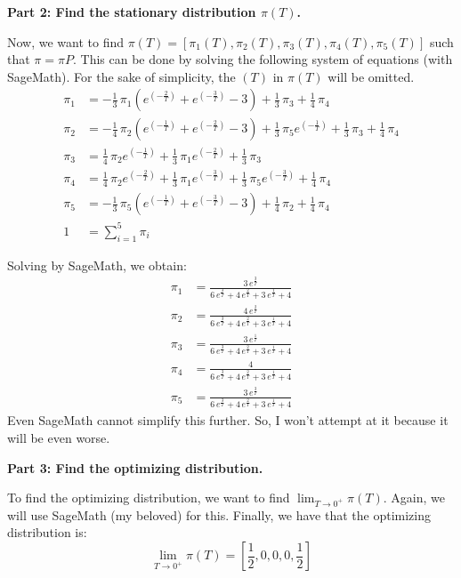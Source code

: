 \noindent\textbf{Part 2: Find the stationary distribution \(\pi(T)\).}

Now, we want to find \(\pi(T) = [\pi_1(T), \pi_2(T), \pi_3(T), \pi_4(T), \pi_5(T)]\) such that \(\pi = \pi P\). This can be done by solving the following system of equations (with SageMath). For the sake of simplicity, the \((T)\) in \(\pi(T)\) will be omitted.
\[
\begin{aligned}
    \pi_1 &= -\frac{1}{3} \, \pi_{1} {\left(e^{\left(-\frac{2}{T}\right)} + e^{\left(-\frac{3}{T}\right)} - 3\right)} + \frac{1}{3} \, \pi_{3} + \frac{1}{4} \, \pi_{4} \\
    \pi_2 &= -\frac{1}{4} \, \pi_{2} {\left(e^{\left(-\frac{1}{T}\right)} + e^{\left(-\frac{2}{T}\right)} - 3\right)} + \frac{1}{3} \, \pi_{5} e^{\left(-\frac{1}{T}\right)} + \frac{1}{3} \, \pi_{3} + \frac{1}{4} \, \pi_{4} \\
    \pi_3 &= \frac{1}{4} \, \pi_{2} e^{\left(-\frac{1}{T}\right)} + \frac{1}{3} \, \pi_{1} e^{\left(-\frac{2}{T}\right)} + \frac{1}{3} \, \pi_{3} \\
    \pi_4 &= \frac{1}{4} \, \pi_{2} e^{\left(-\frac{2}{T}\right)} + \frac{1}{3} \, \pi_{1} e^{\left(-\frac{3}{T}\right)} + \frac{1}{3} \, \pi_{5} e^{\left(-\frac{3}{T}\right)} + \frac{1}{4} \, \pi_{4} \\
    \pi_5 &= -\frac{1}{3} \, \pi_{5} {\left(e^{\left(-\frac{1}{T}\right)} + e^{\left(-\frac{3}{T}\right)} - 3\right)} + \frac{1}{4} \, \pi_{2} + \frac{1}{4} \, \pi_{4} \\
    1 &= \sum_{i=1}^5 \pi_i
\end{aligned}
\]

Solving by SageMath, we obtain:
\[
\begin{aligned}
    \pi_{1} &= \frac{3 \, e^{\frac{3}{T}}}{6 \, e^{\frac{3}{T}} + 4 \, e^{\frac{2}{T}} + 3 \, e^{\frac{1}{T}} + 4} \\
    \pi_{2} &= \frac{4 \, e^{\frac{2}{T}}}{6 \, e^{\frac{3}{T}} + 4 \, e^{\frac{2}{T}} + 3 \, e^{\frac{1}{T}} + 4} \\
    \pi_{3} &= \frac{3 \, e^{\frac{1}{T}}}{6 \, e^{\frac{3}{T}} + 4 \, e^{\frac{2}{T}} + 3 \, e^{\frac{1}{T}} + 4} \\
    \pi_{4} &= \frac{4}{6 \, e^{\frac{3}{T}} + 4 \, e^{\frac{2}{T}} + 3 \, e^{\frac{1}{T}} + 4} \\
    \pi_{5} &= \frac{3 \, e^{\frac{3}{T}}}{6 \, e^{\frac{3}{T}} + 4 \, e^{\frac{2}{T}} + 3 \, e^{\frac{1}{T}} + 4}
\end{aligned}
\]
Even SageMath cannot simplify this further. So, I won't attempt at it because it will be even worse.

\noindent\textbf{Part 3: Find the optimizing distribution.}

To find the optimizing distribution, we want to find \(\lim_{T \to 0^+} \pi(T)\). Again, we will use SageMath (my beloved) for this. Finally, we have that the optimizing distribution is:
\[
    \lim_{T \to 0^+} \pi(T) = \left[\frac12, 0, 0, 0, \frac12\right]
\]
